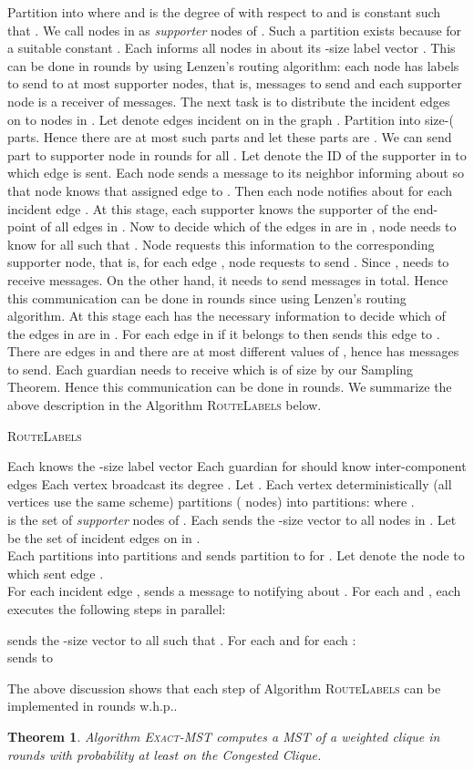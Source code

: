 \documentclass[11pt]{article}
\newlength\myindent
\newcommand\bindent{\begingroup
    \setlength{\itemindent}{\myindent}
    \addtolength{\algorithmicindent}{\myindent}
}
\newcommand\eindent{\endgroup}
\newtheorem{theorem}{Theorem}
\newcommand{\lra}{Lenzen's routing algorithm}
\begin{document}
Partition  into  where  and  is the degree of  with respect to  and  is constant such that . 
We call nodes in  as \emph{supporter} nodes of .
Such a partition exists because  for a suitable constant . 
Each  informs all nodes in  about its -size label vector . 
This can be done in  rounds by using \lra:
each node  has  labels to send to at most  supporter nodes, that is,  messages to send and each supporter node is a receiver of  messages. 
The next task is to distribute the incident edges on  to nodes in . 
Let  denote edges incident on  in the graph . 
Partition  into size-( parts. 
Hence there are at most  such parts and let these parts are . 
We can send part   to supporter node  in  rounds for all . 
Let  denote the ID of the supporter in  to which edge  is sent. 
Each node  sends a message to its neighbor  informing about  so that node  knows that  assigned edge  to . 
Then each node  notifies  about  for each incident edge . 
At this stage, each supporter  knows the supporter of the end-point of all edges in .  
Now to decide which of the edges in  are in , node  needs to know  for all  such that . 
Node  requests this information to the corresponding supporter node, that is, for each edge , node  requests  to send . 
Since ,  needs to receive  messages. 
On the other hand, it needs to send  messages in total. 
Hence this communication can be done in  rounds since  using \lra.
At this stage each  has the necessary information to decide which of the edges in  are in . 
For each edge in  if it belongs to  then  sends this edge to . 
There are  edges in  and there are at most  different values of , hence  has  messages to send. 
Each guardian  needs to receive  which is of size  by our Sampling Theorem. 
Hence this communication can be done in  rounds. 
We summarize the above description in the Algorithm \textsc{RouteLabels} below.
\begin{algorithm}[H]
  \caption{\textsc{RouteLabels}}
  \begin{algorithmic}[1]
    \REQUIRE Each  knows the -size label vector 
    \ENSURE  Each guardian  for  should know inter-component edges  
    \STATE   Each vertex  broadcast its degree . Let . 
    \STATE   Each vertex  deterministically (all vertices use the same scheme) partitions  ( nodes)  into  partitions:  where
	    . \\
	      is the set of \emph{supporter} nodes of . 
    \STATE   Each  sends the -size vector  to all nodes in . 
    \STATE   Let  be the set of incident edges on  in . \\
	     Each  partitions  into  partitions  and
	     sends partition  to  for . 
    \STATE   Let  denote the node to which  sent edge .\\
	     For each incident edge ,  sends a message to  notifying about . 
    \STATE   For each  and , each  executes the following steps in parallel: 
    \bindent
        \STATE  sends the -size vector  to all  such that .
	\STATE For each  and for each :\\
	\IF {} \STATE  sends  to  \ENDIF 
    \eindent
  \end{algorithmic}
\end{algorithm}
The above discussion shows that each step of Algorithm \textsc{RouteLabels} can be implemented in  rounds w.h.p.. 


\begin{theorem}
  Algorithm \textsc{Exact-MST} computes a MST of a weighted clique in  rounds with probability at least  on the Congested Clique. 
\end{theorem}


\end{document}
